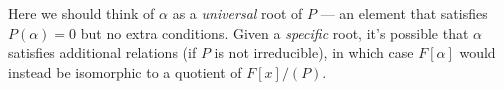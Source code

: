 \begin{note}
Here we should think of $\alpha$ as a \emph{universal} root of $P$ --- an element that satisfies $P(\alpha) = 0$ but no extra conditions. Given a \emph{specific} root, it's possible that $\alpha$ satisfies additional relations (if $P$ is not irreducible), in which case $F[\alpha]$ would instead be isomorphic to a quotient of $F[x]/(P)$. 
\end{note}




